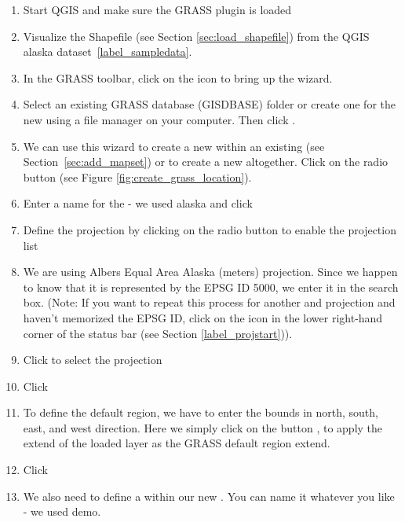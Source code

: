 \begin{enumerate}
  \item Start QGIS and make sure the GRASS plugin is loaded
  \item Visualize the  Shapefile (see Section
  \ref{sec:load_shapefile}) from the QGIS alaska dataset~\ref{label_sampledata}.
  \item In the GRASS toolbar, click on the  icon to bring up the  wizard.
  \item Select an existing GRASS database (GISDBASE) folder 
   or create one for the new  using a 
  file manager on your computer. Then click . 
  \item We can use this wizard to create a new  within an 
  existing  (see Section~\ref{sec:add_mapset}) or to create 
  a new  altogether. Click on the radio button
   (see Figure \ref{fig:create_grass_location}).
  \item Enter a name for the  - we used alaska and click 
  \item Define the projection by clicking on the radio button
   to enable the projection list 
  \item We are using Albers Equal Area Alaska (meters) projection. Since we
  happen to know that it is represented by the EPSG ID 5000, we enter it in
  the search box. (Note: If you want to repeat this process for another 
   and projection and haven't memorized the EPSG ID, 
  click on the
   icon in the lower right-hand
  corner of the status bar (see Section \ref{label_projstart})).
  \item Click  to select the projection
  \item Click  
  \item To define the default region, we have to enter the  
  bounds in north, south, east, and west direction. Here we simply click on 
  the button , to apply the extend of the 
  loaded layer  as the GRASS default region extend.
  \item Click  
  \item We also need to define a  within our new 
  . You can name it whatever you like - we used demo.

\end{enumerate}
